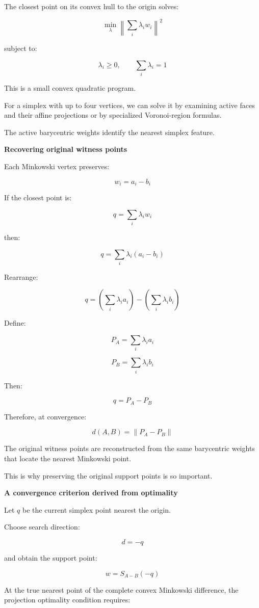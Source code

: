 The closest point on its convex hull to the origin solves:

\[
\boxed{ \min_{\lambda} \left\| \sum_i\lambda_iw_i \right\|^2 }
\]

subject to:

\[
\lambda_i\ge0,\qquad \sum_i\lambda_i=1
\]

This is a small convex quadratic program.

For a simplex with up to four vertices, we can solve it by examining active faces and their affine projections or by specialized Voronoi-region formulas.

The active barycentric weights identify the nearest simplex feature.

\textbf{Recovering original witness points}

Each Minkowski vertex preserves:

\[
w_i=a_i-b_i
\]

If the closest point is:

\[
q=\sum_i\lambda_iw_i
\]

then:

\[
q= \sum_i\lambda_i(a_i-b_i)
\]

Rearrange:

\[
q= \left(\sum_i\lambda_ia_i\right) - \left(\sum_i\lambda_ib_i\right)
\]

Define:

\[
\boxed{ P_A=\sum_i\lambda_ia_i }
\]

\[
\boxed{ P_B=\sum_i\lambda_ib_i }
\]

Then:

\[
\boxed{ q=P_A-P_B }
\]

Therefore, at convergence:

\[
\boxed{ d(A,B)=\|P_A-P_B\| }
\]

The original witness points are reconstructed from the same barycentric weights that locate the nearest Minkowski point.

This is why preserving the original support points is so important.

\textbf{A convergence criterion derived from optimality}

Let \(q\) be the current simplex point nearest the origin.

Choose search direction:

\[
d=-q
\]

and obtain the support point:

\[
w=S_{A-B}(-q)
\]

At the true nearest point of the complete convex Minkowski difference, the projection optimality condition requires:


